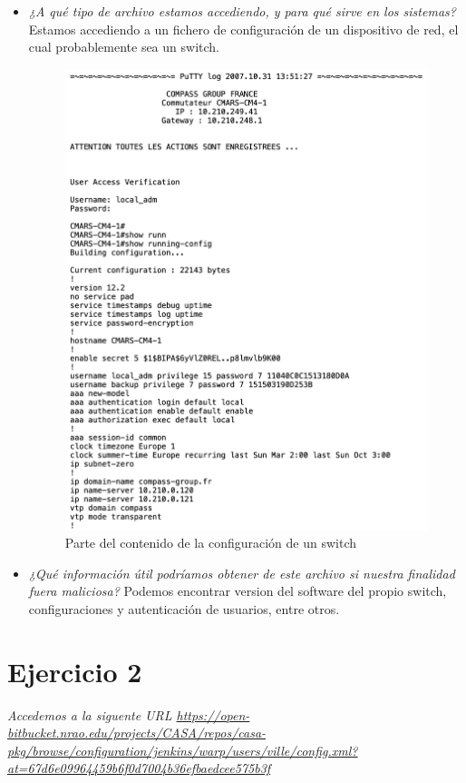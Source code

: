\documentclass[12pt]{book}
\begin{document}
\begin{itemize}
    \item \textit{¿A qué tipo de archivo estamos accediendo, y para qué sirve en los sistemas?}
    \newline
    Estamos accediendo a un fichero de configuración de un dispositivo de red, el cual probablemente sea un switch.

\begin{figure}[h]
    \centering
    \includegraphics[width=0.5\linewidth]{Practica 3y4/images/Screenshot 2024-10-24 at 09.47.24.png}
    \caption{Parte del contenido de la configuración de un switch}
    \label{fig:enter-label}
\end{figure}
    \item \textit{¿Qué información útil podríamos obtener de este archivo si nuestra finalidad fuera maliciosa?}
    \newline
    Podemos encontrar version del software del propio switch, configuraciones y autenticación de usuarios, entre otros.
\end{itemize}


\section{Ejercicio 2}

\textit{Accedemos a la siguente URL \url{https://open-bitbucket.nrao.edu/projects/CASA/repos/casa-pkg/browse/configuration/jenkins/warp/users/ville/config.xml?at=67d6e09964459b6f0d7004b36efbaedcee575b3f}}
\end{document}
